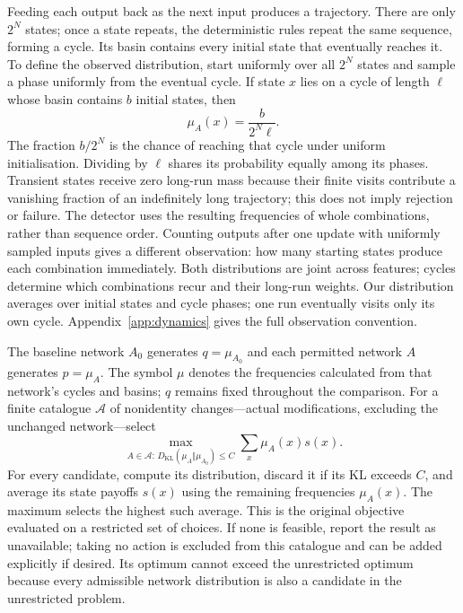 \documentclass[11pt,a4paper]{article}
\newcommand{\KL}{D_{\mathrm{KL}}}
\begin{document}
Feeding each output back as the next input produces a trajectory.
There are only $2^N$ states; once a state repeats, the deterministic rules
repeat the same sequence, forming a cycle. Its basin contains every
initial state that eventually reaches it. To define the observed
distribution, start uniformly over all $2^N$ states and sample a phase
uniformly from the eventual cycle. If state $x$ lies on a cycle of length
$\ell$ whose basin contains $b$ initial states, then
\[
 \mu_A(x)=\frac{b}{2^N\ell}.
\]
The fraction $b/2^N$ is the chance of reaching that cycle under uniform
initialisation. Dividing by $\ell$ shares its probability equally among
its phases. Transient states receive zero long-run mass because their
finite visits contribute a vanishing fraction of an indefinitely long
trajectory; this does not imply rejection or failure. The detector uses
the resulting frequencies of whole combinations, rather than sequence
order. Counting outputs after one update with uniformly sampled inputs
gives a different observation: how many starting states produce each
combination immediately. Both distributions are joint across features;
cycles determine which combinations recur and their long-run weights.
Our distribution averages over initial states and cycle phases; one run
eventually visits only its own cycle. Appendix~\ref{app:dynamics} gives
the full observation convention.

The baseline network $A_0$ generates $q=\mu_{A_0}$ and each permitted
network $A$ generates $p=\mu_A$. The symbol $\mu$ denotes the frequencies
calculated from that network's cycles and basins; $q$ remains fixed
throughout the comparison. For a finite catalogue $\mathcal A$ of
nonidentity changes---actual modifications, excluding the unchanged
network---select
\[
 \max_{A\in\mathcal A:\,\KL(\mu_A\Vert\mu_{A_0})\leq C}
       \sum_x\mu_A(x)s(x).
\]
For every candidate, compute its distribution, discard it if its KL
exceeds $C$, and average its state payoffs $s(x)$ using the remaining
frequencies $\mu_A(x)$. The maximum selects the highest such average.
This is the original objective evaluated on a restricted set of choices.
If none is feasible, report the result as unavailable; taking no action
is excluded from this catalogue and can be added explicitly if desired.
Its optimum cannot exceed the unrestricted optimum because every
admissible network distribution is also a candidate in the unrestricted
problem.
\end{document}
